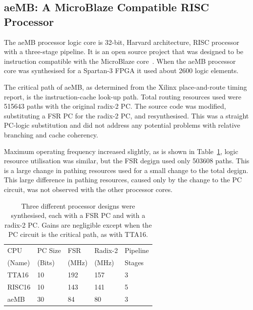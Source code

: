 \documentclass[5p, twocolumn]{elsarticle}
\begin{document}
\subsection{aeMB: A MicroBlaze Compatible RISC Processor}

The aeMB processor logic core is 32-bit, Harvard architecture, RISC processor
with a three-stage pipeline. It is an open source project that was designed to be
instruction compatible with the MicroBlaze core~\cite{xilinx2008mpr}. When the
aeMB processor core was synthesised for a Spartan-3 FPGA it used about 2600
logic elements.

The critical path of aeMB, as determined from the Xilinx place-and-route timing
report, is the instruction-cache look-up path. Total routing resources used were
515643 paths with the original radix-2 PC. The source code was modified,
substituting a FSR PC for the radix-2 PC, and resynthesised. This was a straight
PC-logic substitution and did not address any potential problems with relative
branching and cache coherency.

Maximum operating frequency increased slightly, as is shown in
Table~\ref{CPU_Table}, logic resource utilisation was similar, but the FSR degign
used only 503608 paths. This is a large change in pathing resources used for a
small change to the total degign. This large difference in pathing resources,
caused only by the change to the PC circuit, was not observed with the other
processor cores.

\begin{table}[ht!]
\begin{center}
\begin{tabular}{l | l l l l}
CPU	&	PC Size	& FSR	& Radix-2	& Pipeline	\\
(Name)	&	(Bits)	& (MHz)	& (MHz)		& Stages	\\
\hline
TTA16	&	10	&	192	&	157	&	3	\\
RISC16	&	10	&	143	&	141	&	5	\\
aeMB	&	30	&	84	&	80	&	3	\\	
\end{tabular}
\caption[Processor performance with a FSR PC vs. radix-2 PC]{Three
different processor designs were synthesised, each with a FSR PC and with a
radix-2 PC. Gains are negligible except when the PC circuit is the critical
path, as with TTA16.}
\label{CPU_Table}
\end{center}
\end{table}
\end{document}

